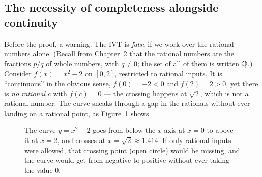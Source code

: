 \subsection{The necessity of completeness alongside continuity}

Before the proof, a warning. The IVT is \emph{false}
if we work over the rational numbers alone. (Recall from Chapter~2 that the rational numbers are the
fractions $p/q$ of whole numbers, with $q\ne0$; the set of all of them is written $\mathbb{Q}$.)
Consider $f(x)=x^2-2$ on $[0,2]$, restricted to
rational inputs. It is ``continuous'' in the obvious sense, $f(0)=-2<0$ and $f(2)=2>0$, yet
there is \emph{no rational} $c$ with $f(c)=0$ --- the crossing happens at $\sqrt 2$, which
is not a rational number. The curve sneaks through a gap in the rationals without ever
landing on a rational point, as Figure~\ref{ch08:fig-rational-gap} shows.

\begin{figure}[htbp]
\centering
{}
\caption{The curve $y=x^2-2$ goes from below the $x$-axis at $x=0$ to above it at $x=2$,
and crosses at $x=\sqrt2\approx1.414$. If only rational inputs were allowed, that crossing
point (open circle) would be missing, and the curve would get from negative to positive
without ever taking the value $0$.}
\label{ch08:fig-rational-gap}
\end{figure}

